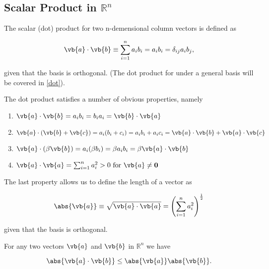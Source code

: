 \documentclass[a4paper,12pt]{report}
\begin{document}
\subsection{Scalar Product in \(\mathbb{R}^{n} \) }

The scalar (dot) product for two n-demensional column vectors is defined as

\begin{equation}
    \vb{a} \cdot \vb{b} \equiv \sum_{i=1}^{n} a_{i} b_{i} = a_{i}b_{i} = \delta _{ij}a_{i}b_{j},    
\end{equation}

given that the basis is orthogonal. (The dot product for under a general basis will be covered in \cref{dot}).

The dot product satisfies a number of obvious properties, namely

\begin{enumerate}
    \item \(\vb{a} \cdot \vb{b} = a_{i} b_{i} = b_{i} a_{i} = \vb{b} \cdot \vb{a}  \)
    \item \(\vb{a} \cdot (\vb{b} + \vb{c} ) = a_{i} (b_{i} + c_{i}  ) = a_{i}b_{i} + a_{i}c_{i}   = \vb{a} \cdot \vb{b} + \vb{a} \cdot \vb{c}  \)
    \item \(\vb{a} \cdot (\beta \vb{b} ) = a_{i}(\beta b_{i} ) = \beta a_{i}b_{i} = \beta \vb{a} \cdot \vb{b}    \)
    \item \(\vb{a} \cdot \vb{a}  = \sum_{i=1}^{n} a_{i}^2 > 0 \text{ for } \vb{a} \neq \boldsymbol{0}  \)
\end{enumerate}

The last property allows us to define the length of a vector as 

\begin{equation}
    \abs{\vb{a} } \equiv \sqrt{\vb{a} \cdot \vb{a} } = \left( \sum_{i=1}^{n} a_{i}^2  \right) ^{\frac{1}{2} } 
\end{equation}

given that the basis is orthogonal.

\begin{lemma}
For any two vectors \(\vb{a} \) and \(\vb{b} \) in \(\mathbb{R}^{n} \) we have

\begin{equation}
    \abs{\vb{a} \cdot \vb{b} } \le \abs{\vb{a} }\abs{\vb{b} }.  
\end{equation}

\end{lemma}
\end{document}
